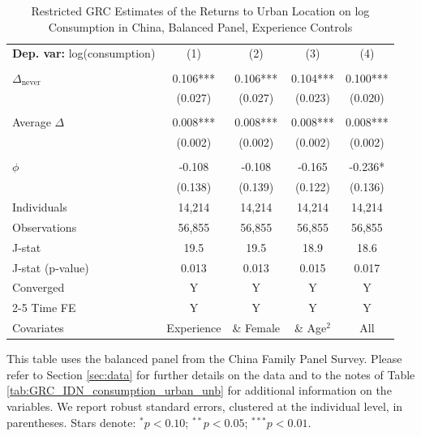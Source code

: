 \begin{table}[htbp] \centering \begin{threeparttable}
 \caption{Restricted GRC Estimates of the Returns to Urban Location on log Consumption in China, Balanced Panel, Experience Controls} 
 \label{tab:GRC_CHN_consumption_urban_bal_exp} 
\begin{tabular}{l cccc} \toprule  \textbf{Dep. var:}  log(consumption) 
                    &\multicolumn{1}{c}{(1)}   &\multicolumn{1}{c}{(2)}   &\multicolumn{1}{c}{(3)}   &\multicolumn{1}{c}{(4)}   \\
                    &               &               &               &               \\
\addlinespace
$\Delta_{\text{never}}$&       0.106***&       0.106***&       0.104***&       0.100***\\
                    &     (0.027)   &     (0.027)   &     (0.023)   &     (0.020)   \\
                    &               &               &               &               \\
\addlinespace
Average $\Delta$    &       0.008***&       0.008***&       0.008***&       0.008***\\
                    &     (0.002)   &     (0.002)   &     (0.002)   &     (0.002)   \\
                    &               &               &               &               \\
\addlinespace
$\phi$              &      -0.108   &      -0.108   &      -0.165   &      -0.236*  \\
                    &     (0.138)   &     (0.139)   &     (0.122)   &     (0.136)   \\
\addlinespace
Individuals         &      14,214   &      14,214   &      14,214   &      14,214   \\
Observations        &      56,855   &      56,855   &      56,855   &      56,855   \\
J-stat              &        19.5   &        19.5   &        18.9   &        18.6   \\
J-stat (p-value)    &       0.013   &       0.013   &       0.015   &       0.017   \\
Converged           &           Y   &           Y   &           Y   &           Y   \\
\cmidrule{2-5} Time FE & Y & Y & Y & Y \\ Covariates & Experience & \& Female & \& Age$^2$ & All \\ \bottomrule \end{tabular} \begin{tablenotes}[flushleft] \footnotesize \item{This table uses the balanced panel from the China Family Panel Survey. Please refer to Section \ref{sec:data} for further details on the data and to the notes of Table \ref{tab:GRC_IDN_consumption_urban_unb} for additional information on the variables. We report robust standard errors, clustered at the individual level, in parentheses. Stars denote: $^{*} p<0.10$; $^{**} p<0.05$; $^{***} p<0.01$.} \end{tablenotes} \end{threeparttable} \end{table}
